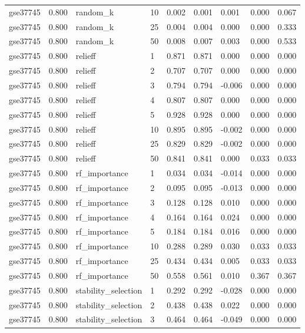 \begin{table}[t]
\begin{tabular}{lllllllll}
    gse37745 & 0.800 & random\_k & 10 & 0.002 & 0.001 & 0.001 & 0.000 & 0.067 \\
    gse37745 & 0.800 & random\_k & 25 & 0.004 & 0.004 & 0.000 & 0.000 & 0.333 \\
    gse37745 & 0.800 & random\_k & 50 & 0.008 & 0.007 & 0.003 & 0.000 & 0.533 \\
    gse37745 & 0.800 & relieff & 1 & 0.871 & 0.871 & 0.000 & 0.000 & 0.000 \\
    gse37745 & 0.800 & relieff & 2 & 0.707 & 0.707 & 0.000 & 0.000 & 0.000 \\
    gse37745 & 0.800 & relieff & 3 & 0.794 & 0.794 & -0.006 & 0.000 & 0.000 \\
    gse37745 & 0.800 & relieff & 4 & 0.807 & 0.807 & 0.000 & 0.000 & 0.000 \\
    gse37745 & 0.800 & relieff & 5 & 0.928 & 0.928 & 0.000 & 0.000 & 0.000 \\
    gse37745 & 0.800 & relieff & 10 & 0.895 & 0.895 & -0.002 & 0.000 & 0.000 \\
    gse37745 & 0.800 & relieff & 25 & 0.829 & 0.829 & -0.002 & 0.000 & 0.000 \\
    gse37745 & 0.800 & relieff & 50 & 0.841 & 0.841 & 0.000 & 0.033 & 0.033 \\
    gse37745 & 0.800 & rf\_importance & 1 & 0.034 & 0.034 & -0.014 & 0.000 & 0.000 \\
    gse37745 & 0.800 & rf\_importance & 2 & 0.095 & 0.095 & -0.013 & 0.000 & 0.000 \\
    gse37745 & 0.800 & rf\_importance & 3 & 0.128 & 0.128 & 0.010 & 0.000 & 0.000 \\
    gse37745 & 0.800 & rf\_importance & 4 & 0.164 & 0.164 & 0.024 & 0.000 & 0.000 \\
    gse37745 & 0.800 & rf\_importance & 5 & 0.184 & 0.184 & 0.016 & 0.000 & 0.000 \\
    gse37745 & 0.800 & rf\_importance & 10 & 0.288 & 0.289 & 0.030 & 0.033 & 0.033 \\
    gse37745 & 0.800 & rf\_importance & 25 & 0.434 & 0.434 & 0.005 & 0.033 & 0.033 \\
    gse37745 & 0.800 & rf\_importance & 50 & 0.558 & 0.561 & 0.010 & 0.367 & 0.367 \\
    gse37745 & 0.800 & stability\_selection & 1 & 0.292 & 0.292 & -0.028 & 0.000 & 0.000 \\
    gse37745 & 0.800 & stability\_selection & 2 & 0.438 & 0.438 & 0.022 & 0.000 & 0.000 \\
    gse37745 & 0.800 & stability\_selection & 3 & 0.464 & 0.464 & -0.049 & 0.000 & 0.000 \\

\end{tabular}
\end{table}
